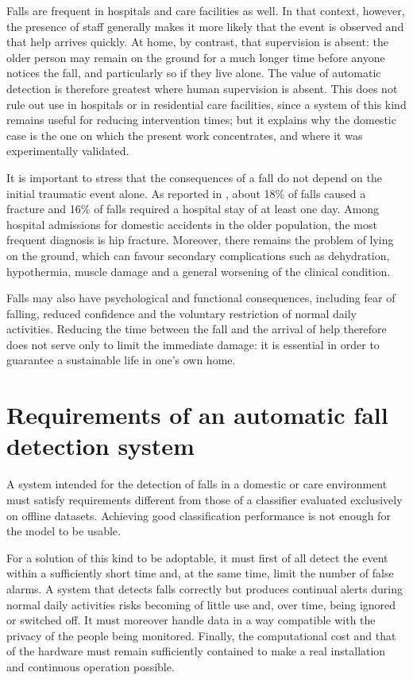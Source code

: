 Falls are frequent in hospitals and care facilities as well. In that context,
however, the presence of staff generally makes it more likely that the event
is observed and that help arrives quickly. At home, by contrast, that
supervision is absent: the older person may remain on the ground for a much
longer time before anyone notices the fall, and particularly so if they live
alone.
The value of automatic detection is therefore greatest where human
supervision is absent. This does not rule out use in hospitals or in
residential care facilities, since a system of this kind remains useful for
reducing intervention times; but it explains why the domestic case is the one
on which the present work concentrates, and where it was experimentally
validated.

It is important to stress that the consequences of a fall do not depend on
the initial traumatic event alone. As reported in \cite{PA}, about 18\% of
falls caused a fracture and 16\% of falls required a hospital stay of at least
one day. Among hospital admissions for domestic accidents in the older
population, the most frequent diagnosis is hip fracture. Moreover, there
remains the problem of lying on the ground, which can favour secondary
complications such as dehydration, hypothermia, muscle damage and a general
worsening of the clinical condition.

Falls may also have psychological and functional consequences, including fear of falling, reduced confidence and the voluntary restriction of normal daily activities. Reducing the time between the fall and the arrival of help therefore does not serve only to limit the immediate damage: it is essential in order to guarantee a sustainable life in one's own home.

\section{Requirements of an automatic fall detection system}

A system intended for the detection of falls in a domestic or care
environment must satisfy requirements different from those of a classifier
evaluated exclusively on offline datasets. Achieving good classification
performance is not enough for the model to be usable.

For a solution of this kind to be adoptable, it must first of all detect the
event within a sufficiently short time and, at the same time, limit the
number of false alarms. A system that detects falls correctly but produces
continual alerts during normal daily activities risks becoming of little use
and, over time, being ignored or switched off. It must moreover handle data in a way compatible with the privacy of the people being monitored. Finally, the computational cost and that of the hardware must remain sufficiently contained to make a real installation and continuous operation possible.

